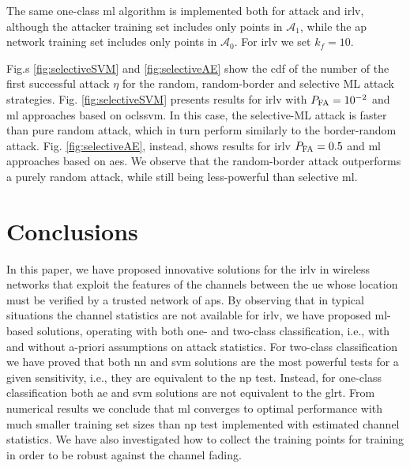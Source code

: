\documentclass[draftcls,onecolumn,12pt]{IEEEtran}
\begin{document}
The same one-class \ac{ml} algorithm is implemented both for attack and \ac{irlv}, although the attacker training set includes only points in $\mathcal A_1$, while the \ac{ap} network training set includes only  points in $\mathcal A_0$. For  \ac{irlv}  we set $k_f=10$.

Fig.s \ref{fig:selectiveSVM} and \ref{fig:selectiveAE} show the \ac{cdf} of the number of the first successful attack $\eta$ for the random, random-border and selective ML attack strategies. Fig. \ref{fig:selectiveSVM} presents results for \ac{irlv} with $P_{\rm FA}=10^{-2}$ and \ac{ml} approaches based on \ac{oclssvm}. In this case, the selective-ML attack is faster than pure random attack, which in turn perform similarly to the border-random  attack.  Fig. \ref{fig:selectiveAE}, instead, shows results for  \ac{irlv} $P_{\rm FA} =0.5$ and \ac{ml} approaches based on \acp{ae}. We observe that the random-border attack outperforms a purely random attack, while still being less-powerful than selective \ac{ml}. 




\section{Conclusions}

In this paper, we have proposed innovative solutions for the \ac{irlv} in wireless networks that exploit the features of the channels between the \ac{ue} whose location must be verified by a trusted network of \acp{ap}. By observing that in typical situations the channel statistics are not available for \ac{irlv}, we have proposed \ac{ml}-based solutions, operating with both one- and two-class classification, i.e., with and without a-priori assumptions on attack statistics. For two-class classification we have proved that  both \ac{nn} and \ac{svm} solutions  are the most powerful tests for a given sensitivity, i.e., they are equivalent to the \ac{np} test. Instead, for one-class classification both \ac{ae} and \ac{svm} solutions are not equivalent to the \ac{glrt}. From numerical results we conclude that \ac{ml} converges to optimal performance with much smaller training set sizes than \ac{np} test implemented with estimated channel statistics. We have also investigated how to collect the training points for training in order to be robust against the channel fading.
\end{document}
